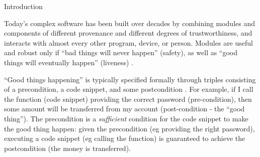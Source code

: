 \newcommand{\sophiaPonder}[2][]{\ponders{Sophia}{blue}{#1} \textcolor{blue}{#2}\xspace}
\renewcommand{\sophia}[2][]

\section{Introduction}

Today's complex software has been built 
over decades by combining modules and components of
different provenance and different degrees of trustworthiness, and 
interacts with almost every other program, device, or person.
Modules are useful and robust only if
``bad things will never happen'' (safety), as well as ``good things
will eventually happen'' (liveness)  \cite{Lamport77}. 
 
 \vspace{.03in}
``Good things happening'' is  typically specified formally 
 through triples consisting of a  precondition, a code snippet, and some
 postcondition \cite{Hoare69}.
 For example, if I call the  function (code snippet) providing the correct 
 password (pre-condition), then some amount will be transferred from my account (post-condition -
 the ``good thing'').
The precondition is a \emph{sufficient} condition for the code snippet to
make the good thing happen: given the precondition (eg providing the right 
password), executing a
code snippet (eg calling the  function) 
is guaranteed to achieve the postcondition (the money is transferred).

 
 
 

